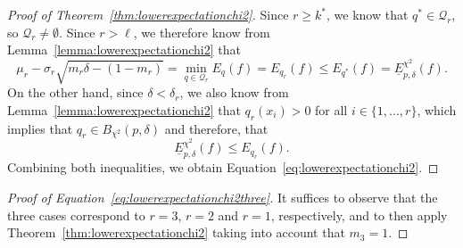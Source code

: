 \documentclass{article}
\begin{document}
\begin{proof}[Proof of Theorem~\ref{thm:lowerexpectationchi2}]
Since $r\geq k^*$, we know that $q^*\in\mathcal{Q}_r$, so $\mathcal{Q}_r\neq\emptyset$. Since $r>\ell$, we therefore know from Lemma~\ref{lemma:lowerexpectationchi2} that
\begin{equation*}%
\mu_r-\sigma_r\sqrt{m_r\delta-(1-m_r)}
=\min_{q\in\mathcal{Q}_r} E_q(f)
=E_{q_r}(f)
\leq E_{q^*}(f)=\underline{E}^{\chi^2}_{p,\delta}(f).
\end{equation*}
On the other hand, since $\delta<\delta_r$, we also know from Lemma~\ref{lemma:lowerexpectationchi2} that $q_r(x_i)>0$ for all $i\in\{1,\ldots,r\}$, which implies that $q_r\in B_{\chi^2}(p,\delta)$ and therefore, that
\begin{equation*}%
\underline{E}^{\chi^2}_{p,\delta}(f)\leq E_{q_r}(f).
\end{equation*}
Combining both inequalities, we obtain Equation~\eqref{eq:lowerexpectationchi2}.
\end{proof}

\begin{proof}[Proof of Equation~\eqref{eq:lowerexpectationchi2three}]
It suffices to observe that the three cases correspond to $r=3$, $r=2$ and $r=1$, respectively, and to then apply Theorem~\ref{thm:lowerexpectationchi2} taking into account that $m_3=1$.
\end{proof}
\end{document}
